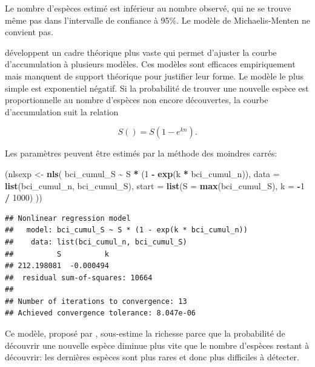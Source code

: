 \documentclass[
  11pt,
  american,
  a4paper,
  extrafontsizes,onecolumn,openright
  ]{memoir}
\newenvironment{Shaded}{\begin{snugshade}}{\end{snugshade}}
\newcommand{\AttributeTok}[1]{\textcolor[rgb]{0.13,0.29,0.53}{#1}}
\newcommand{\DecValTok}[1]{\textcolor[rgb]{0.00,0.00,0.81}{#1}}
\newcommand{\FunctionTok}[1]{\textcolor[rgb]{0.13,0.29,0.53}{\textbf{#1}}}
\newcommand{\NormalTok}[1]{#1}
\newcommand{\OtherTok}[1]{\textcolor[rgb]{0.56,0.35,0.01}{#1}}
\newcommand{\SpecialCharTok}[1]{\textcolor[rgb]{0.81,0.36,0.00}{\textbf{#1}}}
\begin{document}
\normalsize

Le nombre d'espèces estimé est inférieur au nombre observé, qui ne se trouve même pas dans l'intervalle de confiance à 95\%.
Le modèle de Michaelis-Menten ne convient pas.

\textcite{Soberon1993} développent un cadre théorique plus vaste qui permet d'ajuster la courbe d'accumulation à plusieurs modèles.
Ces modèles sont efficaces empiriquement mais manquent de support théorique pour justifier leur forme.
Le modèle le plus simple est exponentiel négatif.
Si la probabilité de trouver une nouvelle espèce est proportionnelle au nombre d'espèces non encore découvertes, la courbe d'accumulation suit la relation

\begin{equation} 
  \label{eq:Soberon1993a}
  S() = S \left( 1 - e^{kn} \right).
\end{equation}

Les paramètres peuvent être estimés par la méthode des moindres carrés:

\scriptsize

\begin{Shaded}
\begin{Highlighting}[]
\NormalTok{(nlsexp }\OtherTok{\textless{}{-}} \FunctionTok{nls}\NormalTok{(}
\NormalTok{  bci\_cumul\_S }\SpecialCharTok{\textasciitilde{}}\NormalTok{ S }\SpecialCharTok{*}\NormalTok{ (}\DecValTok{1} \SpecialCharTok{{-}} \FunctionTok{exp}\NormalTok{(k }\SpecialCharTok{*}\NormalTok{ bci\_cumul\_n)), }
  \AttributeTok{data =} \FunctionTok{list}\NormalTok{(bci\_cumul\_n, bci\_cumul\_S), }
  \AttributeTok{start =} \FunctionTok{list}\NormalTok{(}\AttributeTok{S =} \FunctionTok{max}\NormalTok{(bci\_cumul\_S), }\AttributeTok{k =} \SpecialCharTok{{-}}\DecValTok{1} \SpecialCharTok{/} \DecValTok{1000}\NormalTok{)}
\NormalTok{))}
\end{Highlighting}
\end{Shaded}

\begin{verbatim}
## Nonlinear regression model
##   model: bci_cumul_S ~ S * (1 - exp(k * bci_cumul_n))
##    data: list(bci_cumul_n, bci_cumul_S)
##          S          k 
## 212.198081  -0.000494 
##  residual sum-of-squares: 10664
## 
## Number of iterations to convergence: 13 
## Achieved convergence tolerance: 8.047e-06
\end{verbatim}

\normalsize

Ce modèle, proposé par \textcite{Holdridge1971}, sous-estime la richesse parce que la probabilité de découvrir une nouvelle espèce diminue plus vite que le nombre d'espèces restant à découvrir: les dernières espèces sont plus rares et donc plus difficiles à détecter.
\end{document}

